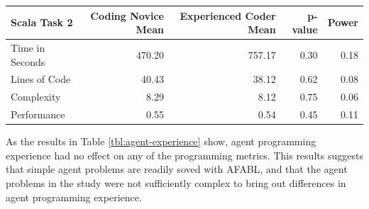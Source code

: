 \begin{center}
\begin{table}[h]
\begin{center}
\begin{tabular}{|l|r|r|r|r|}\hline
Scala Task 2 & Coding Novice Mean & Experienced Coder Mean & p-value & Power\\\hline
Time in Seconds & 470.20 & 757.17 & 0.30 & 0.18\\
Lines of Code & 40.43 & 38.12 & 0.62 & 0.08\\
Complexity & 8.29 & 8.12 & 0.75 & 0.06\\
Performance & 0.55 & 0.54 & 0.45 & 0.11\\
\hline
\end{tabular}

\end{center}
\label{tbl:code-experience}
\end{table}
\end{center}


As the results in Table \ref{tbl:agent-experience} show, agent programming experience had no effect on any of the programming metrics. This results suggests that simple agent problems are readily soved with AFABL, and that the agent problems in the study were not sufficiently complex to bring out differences in agent programming experience.


